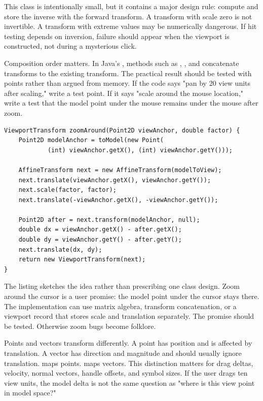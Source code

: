 This class is intentionally small, but it contains a major design rule: compute and store the inverse with the forward transform. A transform with scale zero is not invertible. A transform with extreme values may be numerically dangerous. If hit testing depends on inversion, failure should appear when the viewport is constructed, not during a mysterious click.

Composition order matters. In Java's , methods such as , , and  concatenate transforms to the existing transform. The practical result should be tested with points rather than argued from memory. If the code says "pan by 20 view units after scaling," write a test point. If it says "scale around the mouse location," write a test that the model point under the mouse remains under the mouse after zoom.

\begin{lstlisting}[caption={Zooming around a fixed view point.}]
ViewportTransform zoomAround(Point2D viewAnchor, double factor) {
    Point2D modelAnchor = toModel(new Point(
            (int) viewAnchor.getX(), (int) viewAnchor.getY()));

    AffineTransform next = new AffineTransform(modelToView);
    next.translate(viewAnchor.getX(), viewAnchor.getY());
    next.scale(factor, factor);
    next.translate(-viewAnchor.getX(), -viewAnchor.getY());

    Point2D after = next.transform(modelAnchor, null);
    double dx = viewAnchor.getX() - after.getX();
    double dy = viewAnchor.getY() - after.getY();
    next.translate(dx, dy);
    return new ViewportTransform(next);
}
\end{lstlisting}

The listing sketches the idea rather than prescribing one class design. Zoom around the cursor is a user promise: the model point under the cursor stays there. The implementation can use matrix algebra, transform concatenation, or a viewport record that stores scale and translation separately. The promise should be tested. Otherwise zoom bugs become folklore.

Points and vectors transform differently. A point has position and is affected by translation. A vector has direction and magnitude and should usually ignore translation.  maps points.  maps vectors. This distinction matters for drag deltas, velocity, normal vectors, handle offsets, and symbol sizes. If the user drags ten view units, the model delta is not the same question as "where is this view point in model space?"


